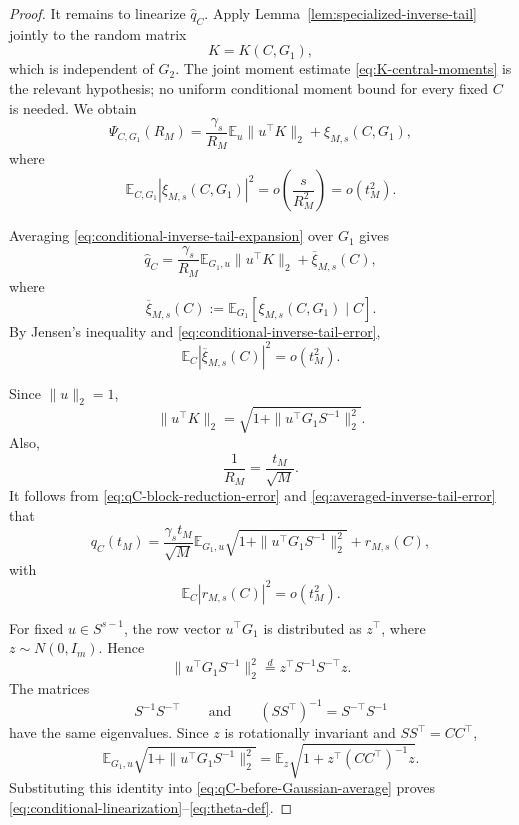\documentclass[10pt,a4paper]{amsart}
\newcommand{\Ebb}{\mathbb E}
\theoremstyle{plain}
\begin{document}
\begin{proof}
It remains to linearize \(\widehat q_C\).  Apply
Lemma~\ref{lem:specialized-inverse-tail} jointly to the random matrix
\[
        K=K(C,G_1),
\]
which is independent of \(G_2\).  The joint moment estimate
\eqref{eq:K-central-moments} is the relevant hypothesis; no uniform conditional
moment bound for every fixed \(C\) is needed.  We obtain
\begin{equation}
        \Psi_{C,G_1}(R_M)
        =
        \frac{\gamma_s}{R_M}
        \Ebb_u\|u^\top K\|_2
        +
        \xi_{M,s}(C,G_1),
        \label{eq:conditional-inverse-tail-expansion}
\end{equation}
where
\begin{equation}
        \Ebb_{C,G_1}
        |\xi_{M,s}(C,G_1)|^2
        =
        o\left(\frac{s}{R_M^2}\right)
        =
        o(t_M^2).
        \label{eq:conditional-inverse-tail-error}
\end{equation}

Averaging \eqref{eq:conditional-inverse-tail-expansion} over \(G_1\) gives
\[
        \widehat q_C
        =
        \frac{\gamma_s}{R_M}
        \Ebb_{G_1,u}\|u^\top K\|_2
        +
        \overline\xi_{M,s}(C),
\]
where
\[
        \overline\xi_{M,s}(C)
        :=
        \Ebb_{G_1}[\xi_{M,s}(C,G_1)\mid C].
\]
By Jensen's inequality and \eqref{eq:conditional-inverse-tail-error},
\begin{equation}
        \Ebb_C|\overline\xi_{M,s}(C)|^2
        =
        o(t_M^2).
        \label{eq:averaged-inverse-tail-error}
\end{equation}

Since \(\|u\|_2=1\),
\[
        \|u^\top K\|_2
        =
        \sqrt{1+\|u^\top G_1S^{-1}\|_2^2}.
\]
Also,
\[
        \frac{1}{R_M}
        =
        \frac{t_M}{\sqrt M}.
\]
It follows from \eqref{eq:qC-block-reduction-error} and
\eqref{eq:averaged-inverse-tail-error} that
\begin{equation}
        q_C(t_M)
        =
        \frac{\gamma_s t_M}{\sqrt M}
        \Ebb_{G_1,u}
        \sqrt{1+\|u^\top G_1S^{-1}\|_2^2}
        +
        r_{M,s}(C),
        \label{eq:qC-before-Gaussian-average}
\end{equation}
with
\[
        \Ebb_C|r_{M,s}(C)|^2=o(t_M^2).
\]

For fixed \(u\in S^{s-1}\), the row vector \(u^\top G_1\) is distributed as
\(z^\top\), where \(z\sim N(0,I_m)\).  Hence
\[
        \|u^\top G_1S^{-1}\|_2^2
        \stackrel{d}{=}
        z^\top S^{-1}S^{-\top}z.
\]
The matrices
\[
        S^{-1}S^{-\top}
        \qquad\text{and}\qquad
        (SS^\top)^{-1}=S^{-\top}S^{-1}
\]
have the same eigenvalues.  Since \(z\) is rotationally invariant and
\(SS^\top=CC^\top\),
\[
        \Ebb_{G_1,u}
        \sqrt{1+\|u^\top G_1S^{-1}\|_2^2}
        =
        \Ebb_z
        \sqrt{1+z^\top(CC^\top)^{-1}z}.
\]
Substituting this identity into \eqref{eq:qC-before-Gaussian-average} proves
\eqref{eq:conditional-linearization}--\eqref{eq:theta-def}.
\end{proof}
\end{document}
